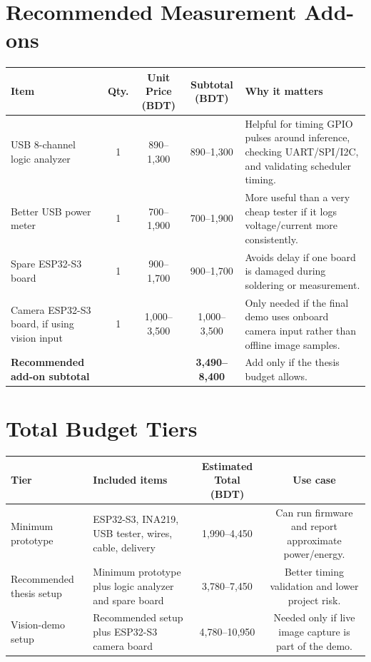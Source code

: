 \documentclass[11pt]{article}
\begin{document}
\section*{Recommended Measurement Add-ons}
\begin{tabular}{p{4.2cm}cccp{4.8cm}}
\toprule
Item & Qty. & Unit Price (BDT) & Subtotal (BDT) & Why it matters \\
\midrule
USB 8-channel logic analyzer & 1 & 890--1,300 & 890--1,300 & Helpful for timing GPIO pulses around inference, checking UART/SPI/I2C, and validating scheduler timing. \\
Better USB power meter & 1 & 700--1,900 & 700--1,900 & More useful than a very cheap tester if it logs voltage/current more consistently. \\
Spare ESP32-S3 board & 1 & 900--1,700 & 900--1,700 & Avoids delay if one board is damaged during soldering or measurement. \\
Camera ESP32-S3 board, if using vision input & 1 & 1,000--3,500 & 1,000--3,500 & Only needed if the final demo uses onboard camera input rather than offline image samples. \\
\midrule
\textbf{Recommended add-on subtotal} & & & \textbf{3,490--8,400} & Add only if the thesis budget allows. \\
\bottomrule
\end{tabular}

\section*{Total Budget Tiers}
\begin{tabular}{p{4.2cm}p{5.2cm}cc}
\toprule
Tier & Included items & Estimated Total (BDT) & Use case \\
\midrule
Minimum prototype & ESP32-S3, INA219, USB tester, wires, cable, delivery & 1,990--4,450 & Can run firmware and report approximate power/energy. \\
Recommended thesis setup & Minimum prototype plus logic analyzer and spare board & 3,780--7,450 & Better timing validation and lower project risk. \\
Vision-demo setup & Recommended setup plus ESP32-S3 camera board & 4,780--10,950 & Needed only if live image capture is part of the demo. \\
\bottomrule
\end{tabular}
\end{document}
